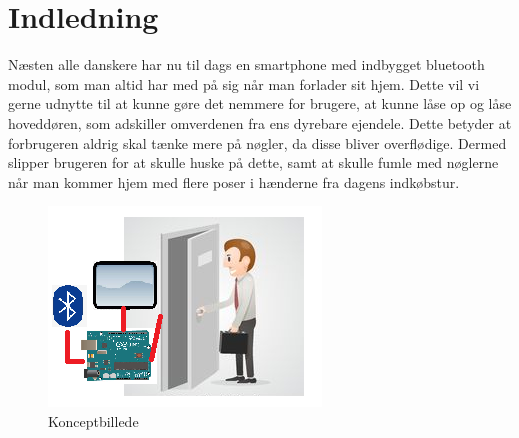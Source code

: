 \graphicspath{{Chapters/Indledning/}}

\section{Indledning}
Næsten alle danskere har nu til dags en smartphone med indbygget bluetooth modul, som man altid har med på sig når man forlader sit hjem. Dette vil vi gerne udnytte til at kunne gøre det nemmere for brugere, at kunne låse op og låse hoveddøren, som adskiller omverdenen fra ens dyrebare ejendele. Dette betyder at forbrugeren aldrig skal tænke mere på nøgler, da disse bliver overflødige. Dermed slipper brugeren for at skulle huske på dette, samt at skulle fumle med nøglerne når man kommer hjem med flere poser i hænderne fra dagens indkøbstur. 

\begin{figure}[H]
	\centering
	\includegraphics[width = 300 pt]{Img/Konceptbillede.png}
	\caption{Konceptbillede}
	\label{fig:Konceptbillede}
\end{figure}
